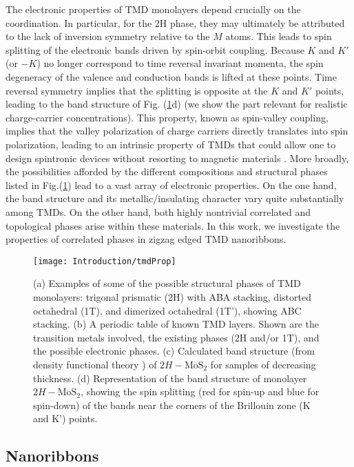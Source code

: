 The electronic properties of \ac{TMD} monolayers depend crucially on the coordination.
In particular, for the 2H phase, they may ultimately be attributed to the lack of inversion symmetry relative to the $M$ atoms.
This leads to spin splitting of the electronic bands driven by spin-orbit coupling.
Because $K$ and $K'$ (or $-K$) no longer correspond to time reversal invariant momenta, the spin degeneracy of the valence and conduction bands is lifted at these points.
Time reversal symmetry implies that the splitting is opposite at the $K$ and $K'$ points, leading to the band structure of Fig. (\ref{fig:tmdProp}d) (we show the part relevant for realistic charge-carrier concentrations).
This property, known as spin-valley coupling, implies that the valley polarization of charge carriers directly translates into spin polarization, leading to an intrinsic property of \acp{TMD} that could allow one to design spintronic devices without resorting to magnetic materials \cite{manzeli_2d_2017}.
More broadly, the possibilities afforded by the different compositions and structural phases listed in Fig.(\ref{fig:tmdProp}) lead to a vast array of electronic properties.
On the one hand, the band structure and its metallic/insulating character vary quite substantially among \acp{TMD}.
On the other hand, both highly nontrivial  correlated and topological phases arise within these materials.
In this work, we investigate the properties of correlated phases in zigzag edged \ac{TMD} nanoribbons.

\begin{figure}
\centering
\texttt{[image: Introduction/tmdProp]}
 \caption[Structure and electronic properties of \ac{TMD} monolayers.]{(a) Examples of some of the possible structural phases of \ac{TMD} monolayers: trigonal prismatic (2H) with ABA stacking, distorted octahedral (1T), and dimerized octahedral (1T'), showing ABC stacking. (b) A periodic table of known \ac{TMD} layers. Shown are the transition metals involved, the existing phases (2H and/or 1T), and the possible electronic phases. (c) Calculated band structure (from density functional theory \cite{splendiani_emerging_2010} ) of $2H-\text{Mo}\text{S}_2$ for samples of decreasing thickness. (d) Representation of the band structure of monolayer $2H-\text{Mo}\text{S}_2$, showing the spin splitting (red for spin-up and blue for spin-down) of the bands near the corners of the Brillouin zone (K and K') points. \label{fig:tmdProp}}
\end{figure}

\subsection{Nanoribbons}\label{subsec:nanoribbons}

